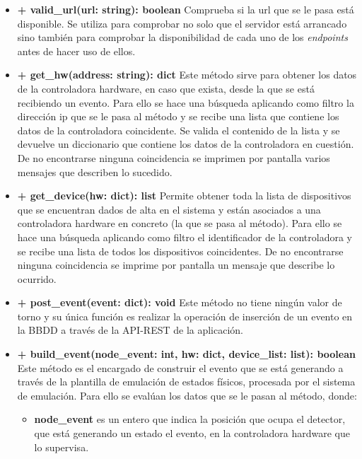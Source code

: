 \begin{itemize}
\item \textbf{+ valid\_url(url: string): boolean} Comprueba si la url que se le pasa está disponible. Se utiliza para comprobar no solo que el servidor está arrancado sino también para comprobar la disponibilidad de cada uno de los \textit{endpoints} antes de hacer uso de ellos.

\item \textbf{+ get\_hw(address: string): dict} Este método sirve para obtener los datos de la controladora hardware, en caso que exista, desde la que se está recibiendo un evento. Para ello se hace una búsqueda aplicando como filtro la dirección ip que se le pasa al método y se recibe una lista que contiene los datos de la controladora coincidente. Se valida el contenido de la lista y se devuelve un diccionario que contiene los datos de la controladora en cuestión. De no encontrarse ninguna coincidencia se imprimen por pantalla varios mensajes que describen lo sucedido.

\item \textbf{+ get\_device(hw: dict): list} Permite obtener toda la lista de dispositivos que se encuentran dados de alta en el sistema y están asociados a una controladora hardware en concreto (la que se pasa al método). Para ello se hace una búsqueda aplicando como filtro el identificador de la controladora y se recibe una lista de todos los dispositivos coincidentes. De no encontrarse ninguna coincidencia se imprime por pantalla un mensaje que describe lo ocurrido.


\item \textbf{+ post\_event(event: dict): void} Este método no tiene ningún valor de torno y su única función es realizar la operación de inserción de un evento en la \acs{BBDD} a través de la \acs{API}-\acs{REST} de la aplicación.

\item \textbf{+ build\_event(node\_event: int, hw: dict, device\_list: list): boolean} Este método es el encargado de construir el evento que se está generando a través de la plantilla de emulación de estados físicos, procesada por el sistema de emulación. Para ello se evalúan los datos que se le pasan al método, donde:

\begin{itemize}
  \item \textbf{node\_event} es un entero que indica la posición que ocupa el detector, que está generando un estado el evento, en la controladora hardware que lo supervisa.


\end{itemize}
\end{itemize}
